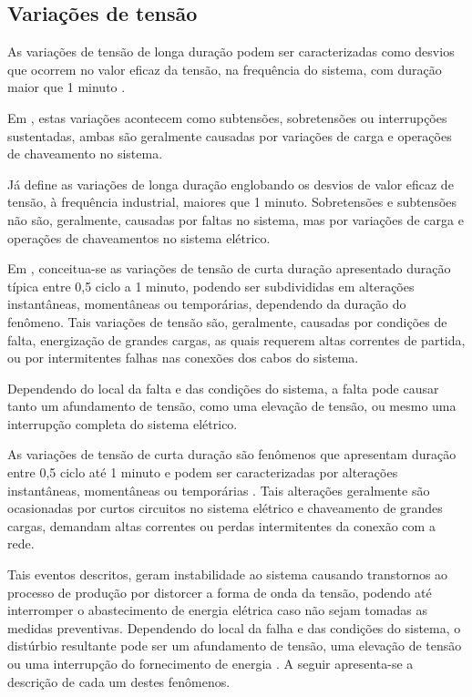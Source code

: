 \subsection{Variações de tensão}\label{qeeVarTens}
%
\par
As variações de tensão de longa duração podem ser caracterizadas como desvios que ocorrem no valor eficaz da tensão, na frequência do sistema, com duração maior que 1 minuto \cite{DUG96}.
\par 
Em \cite{DEL03}, estas variações acontecem como subtensões, sobretensões ou interrupções sustentadas, ambas são geralmente causadas por variações de carga e operações de chaveamento no sistema.
\par 
Já \cite{FER99} define as variações de longa duração englobando os desvios de valor eficaz de tensão, à frequência industrial, maiores que 1 minuto. Sobretensões e subtensões não são, geralmente, causadas por faltas no sistema, mas por variações de carga e operações de chaveamentos no sistema elétrico.

\par 
Em \cite{DUG96}, conceitua-se as variações de tensão de curta duração apresentado duração típica entre 0,5 ciclo a 1 minuto, podendo ser subdivididas em alterações instantâneas, momentâneas ou temporárias, dependendo da duração do fenômeno. Tais variações de tensão são, geralmente, causadas por condições de falta, energização de grandes cargas, as quais requerem altas correntes de partida, ou por intermitentes falhas nas conexões dos cabos do sistema. 
\par 
Dependendo do local da falta e das condições do sistema, a falta pode causar tanto um afundamento de tensão, como uma elevação de tensão, ou mesmo uma interrupção completa do sistema elétrico.
\par 
As variações de tensão de curta duração são fenômenos que apresentam duração entre 0,5 ciclo até 1 minuto e podem ser caracterizadas por alterações instantâneas, momentâneas ou temporárias \cite{JUN09}. Tais alterações geralmente são ocasionadas por curtos circuitos no sistema elétrico e chaveamento de grandes cargas, demandam altas correntes ou perdas intermitentes da conexão com a rede. 
\par 
Tais eventos descritos, geram instabilidade ao sistema causando transtornos ao processo de produção por distorcer a forma de onda da tensão, podendo até interromper o abastecimento de energia elétrica caso não sejam tomadas as medidas preventivas. Dependendo do local da falha e das condições do sistema, o distúrbio resultante pode ser um afundamento de tensão, uma elevação de tensão ou uma interrupção do fornecimento de energia \cite{IEE95}. A seguir apresenta-se a descrição de cada um destes fenômenos.

